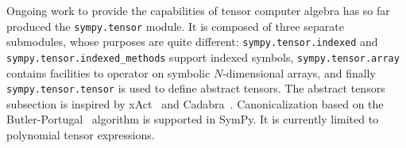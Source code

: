 Ongoing work to provide the capabilities of tensor computer algebra has so far
produced the \texttt{sympy.tensor} module.  It is composed of three separate
submodules, whose purposes are quite different: \texttt{sympy.\allowbreak{}tensor.\allowbreak{}indexed} and
\texttt{sympy.\allowbreak{}tensor.\allowbreak{}indexed\_methods} support indexed symbols,
\texttt{sympy.\allowbreak{}tensor.\allowbreak{}array} contains facilities to operator on symbolic $N$-dimensional
arrays, and finally \texttt{sympy.\allowbreak{}tensor.\allowbreak{}tensor} is used to define abstract tensors.
The abstract tensors subsection
is inspired by xAct~\cite{xAct} and Cadabra~\cite{Peeters2007cadabra}.
Canonicalization based on the Butler-Portugal~\cite{ManssurPortugal1999}
algorithm is supported in SymPy.  It is currently limited to polynomial tensor
expressions.
